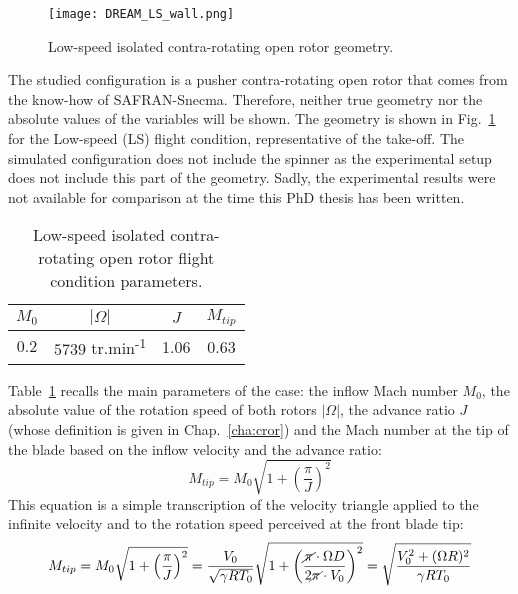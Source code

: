 

\begin{figure}
  \centering
  \texttt{[image: DREAM\_LS\_wall.png]}
  \caption{Low-speed isolated contra-rotating open rotor geometry.}
  \label{fig:dream_ls_wall}
\end{figure}

The studied configuration is a pusher contra-rotating open rotor
that comes from the know-how of SAFRAN-Snecma. Therefore,
neither true geometry nor the absolute values of the variables
will be shown.
The geometry is shown in Fig.~\ref{fig:dream_ls_wall} for the
Low-speed (LS) flight condition, representative of the take-off. 
The simulated configuration does not include the spinner as the
experimental setup does not include this part of the geometry.
Sadly, the experimental results were not available for comparison
at the time this PhD thesis has been written.

\begin{table}
   \centering
  \begin{tabular}{cccc}
    \toprule
    $M_0$ & $|\Omega|$ & $J$ & $M_{tip}$ \\
    \midrule
    $0.2$ & $5739$ tr.min\textsuperscript{-1} & 1.06 & 0.63 \\
    \bottomrule
  \end{tabular}
  \caption{Low-speed isolated contra-rotating open rotor flight condition parameters.}
  \label{tab:dream_ls_flight_condition}
\end{table} 
Table~\ref{tab:dream_ls_flight_condition} recalls the main
parameters of the case: the inflow Mach number $M_0$,
the absolute value of the rotation speed of both rotors $|\Omega|$,
the advance ratio $J$ (whose definition is given in Chap.~\ref{cha:cror})
and the Mach number at the tip of
the blade based on the inflow velocity and the advance ratio:
\begin{equation}
	M_{tip} = M_0 \sqrt{1 + \left(\frac{\pi}{J} \right)^2}
\end{equation}
This equation is a simple transcription of the velocity triangle
applied to the infinite velocity and to the rotation speed perceived
at the front blade tip:
\begin{equation}
    M_{tip} = M_0 \sqrt{1 + \left(\frac{\pi}{J}\right)^2} = 
    \frac{V_0}{\sqrt{\gamma R T_0}} \sqrt{1 + \left(\frac{
    	\cancel{\pi} \cdot \Omega D}{
    	2 \cancel{\pi} \cdot V_0}\right)^2} =
    \sqrt{\frac{V_0^2 + (\Omega R)^2}{\gamma R T_0}}
    \label{eq:m_tip_explained}
\end{equation}

